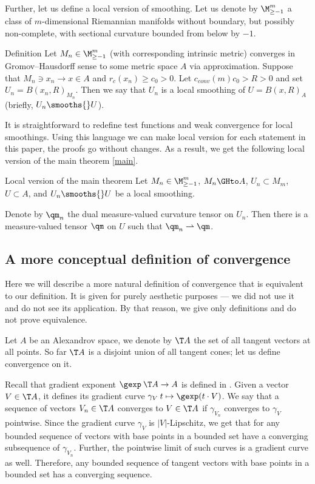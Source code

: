 Further, let us define a local version of smoothing.
Let us denote by
$\M_{\ge -1}^m$ a class of $m$-dimensional Riemannian 
manifolds without boundary, but possibly non-complete, with sectional curvature bounded
from below by $-1$.

\begin{thm}{Definition}
Let 
$M_n\in\M_{\ge -1}^m$ (with corresponding intrinsic metric)
converges in Gromov--Hausdorff sense to some metric space $A$ via
approximation.
Suppose that $M_n\ni x_n\to x\in A$
and $r_c(x_n)\ge c_0>0$. Let $c_{conv}(m)c_0 > R>0$ and set
$U_n=B(x_n,R)_{M_n}$.
Then we say that $U_n$ is a local smoothing of $U=B(x,R)_A$ (briefly, $U_n\smooths{} U$).
\end{thm}

It is straightforward to redefine test functions and weak convergence for local smoothings.
Using this language we can make local version for each statement in this paper, the proofs go without changes.
As a result, we get the following local version of the main theorem \ref{main}.
 
\begin{thm}{Local version of the main theorem}\label{mainloc}
Let   
$M_n\in\M_{\ge -1}^m$,
$M_n\GHto A$, $U_n\subset M_m$,
  $U\subset A$, and $U_n\smooths{} U$ be a local smoothing.
  
Denote by $\qm_n$ the dual measure-valued curvature tensor on $U_n$.
Then there is a measure-valued tensor $\qm$ on $U$ such that $\qm_n\rightharpoonup \qm$.
\end{thm}





\subsection{A more conceptual definition of convergence}\label{sec:concept}

Here we will describe a more natural definition of convergence that is equivalent to our definition.
It is given for purely aesthetic purposes --- we did not use it and do not see its application.
By that reason, we give only definitions and do not prove equivalence.

Let $A$ be an Alexandrov space, we denote by $\T A$ the set of all tangent vectors at all points.
So far $\T A$ is a disjoint union of all tangent cones;
let us define convergence on it.

Recall that gradient exponent $\gexp\: \T A\to A$ is defined in \cite{AKP}.
Given a vector $V\in \T A$, it defines its gradient curve $\gamma_{V}\:t\mapsto \gexp (t\cdot V)$.
We say that a sequence of vectors $V_n\in \T A$ converges to $V\in \T A$ if $\gamma_{V_n}$ converges to $\gamma_V$ pointwise.
Since the gradient curve $\gamma_V$ is $|V|$-Lipschitz, we get that for any bounded sequence of vectors with base points in a bounded set have a converging subsequence of $\gamma_{V_n}$.
Further, the pointwise limit of such curves is a gradient curve as well.
Therefore, any bounded sequence of tangent vectors with base points in a bounded set has a converging sequence.

